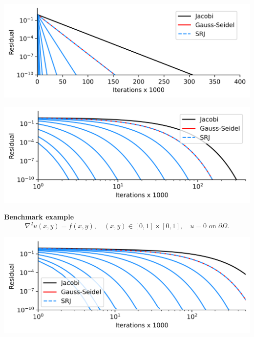 \documentclass[aspectratio=169]{beamer}
\begin{document}
{\begin{frame}
\begin{overprint}
      \includegraphics[width=\textwidth]{comparaisons_1D_srj_k=256}

      \includegraphics[width=\textwidth]{comparaisons_1D_logscale}

    \end{overprint}
    \vspace{-2cm}
  \end{frame}
}

\begin{frame}[t, c]{}{}
  \centering
  \textbf{Benchmark example}
  \medskip
  \large
  \[
  \nabla^2 u(x, y)= f(x, y), \quad (x, y) \in \left[0, 1\right] \times \left[0, 1\right], \quad u = 0 \text{ on } \partial\Omega.
  \]
  
  \vspace{-1cm}
\end{frame}

{
  \begin{frame}[fragile]{}{}
    \vfill
    \centering
    \includegraphics[width=\textwidth]{comparaisons_2D_logscale}
    \vfill
  \end{frame}
}
\end{document}

